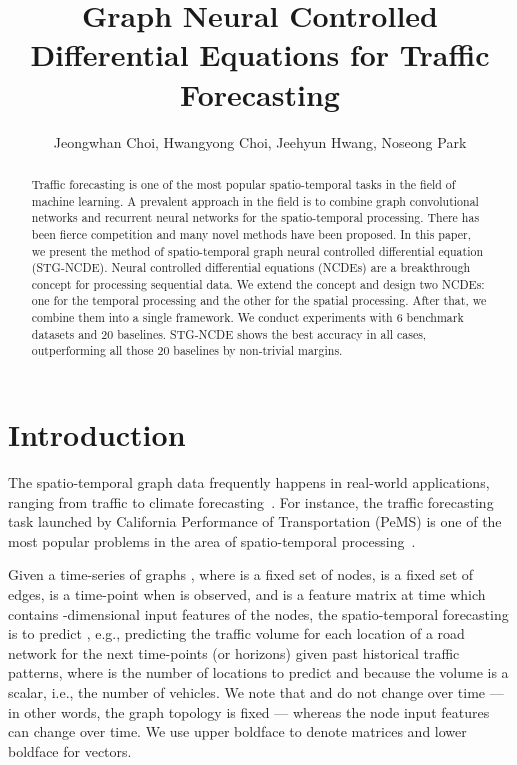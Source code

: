 \documentclass[letterpaper]{article} \usepackage{aaai22}  \usepackage{times}  \usepackage{helvet}  \usepackage{courier}  \usepackage[hyphens]{url}  \usepackage{graphicx} \urlstyle{rm} \def\UrlFont{\rm}  \usepackage{natbib}  \usepackage{caption} \DeclareCaptionStyle{ruled}{labelfont=normalfont,labelsep=colon,strut=off} \frenchspacing  \setlength{\pdfpagewidth}{8.5in}  \setlength{\pdfpageheight}{11in}  \usepackage{stfloats}
\title{Graph Neural Controlled Differential Equations for Traffic Forecasting}
\author {
    Jeongwhan Choi, Hwangyong Choi, Jeehyun Hwang, Noseong Park
}
\begin{document}
\maketitle

\begin{abstract}
Traffic forecasting is one of the most popular spatio-temporal tasks in the field of machine learning. A prevalent approach in the field is to combine graph convolutional networks and recurrent neural networks for the spatio-temporal processing. There has been fierce competition and many novel methods have been proposed. In this paper, we present the method of spatio-temporal graph neural controlled differential equation (STG-NCDE). Neural controlled differential equations (NCDEs) are a breakthrough concept for processing sequential data. We extend the concept and design two NCDEs: one for the temporal processing and the other for the spatial processing. After that, we combine them into a single framework. We conduct experiments with 6 benchmark datasets and 20 baselines. STG-NCDE shows the best accuracy in all cases, outperforming all those 20 baselines by non-trivial margins.
\end{abstract}


\section{Introduction}
The spatio-temporal graph data frequently happens in real-world applications, ranging from traffic to climate forecasting~\cite{zaytar2016sequence, shi2015convolutional,shi2017deep, liu2016application, racah2016extremeweather, kurth2018exascale, cheng2018ensemble, cheng2018neural, hossain2015forecasting, ren2021deep, tekin2021spatio,li2018dcrnn_traffic,bing2018stgcn,wu2019graphwavenet,guo2019astgcn,bai2019STG2Seq,song2020stsgcn,huang2020lsgcn,NEURIPS2020_ce1aad92,li2021stfgnn,chen2021ZGCNET,fang2021STODE}. For instance, the traffic forecasting task launched by California Performance of Transportation (PeMS) is one of the most popular problems in the area of spatio-temporal processing~\cite{chen2001freeway,bing2018stgcn,guo2019astgcn}.

Given a time-series of graphs , where  is a fixed set of nodes,  is a fixed set of edges,  is a time-point when  is observed, and  is a feature matrix at time  which contains -dimensional input features of the nodes, the spatio-temporal forecasting is to predict , e.g., predicting the traffic volume for each location of a road network for the next  time-points (or horizons) given past  historical traffic patterns, where  is the number of locations to predict and  because the volume is a scalar, i.e., the number of vehicles. We note that  and  do not change over time --- in other words, the graph topology is fixed --- whereas the node input features can change over time. We use upper boldface to denote matrices and lower boldface for vectors.
\end{document}
